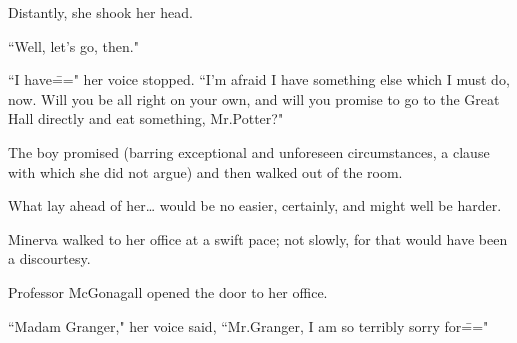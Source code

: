 Distantly, she shook her head.

``Well, let's go, then."

``I have\===" her voice stopped. ``I'm afraid I have something else which I must do, now. Will you be all right on your own, and will you promise to go to the Great Hall directly and eat something, Mr.\?Potter?"

The boy promised (barring exceptional and unforeseen circumstances, a clause with which she did not argue) and then walked out of the room.

What lay ahead of her{\ldots} would be no easier, certainly, and might well be harder.

\later

Minerva walked to her office at a swift pace; not slowly, for that would have been a discourtesy.

Professor McGonagall opened the door to her office.

``Madam Granger," her voice said, ``Mr.\?Granger, I am so terribly sorry for\==="

